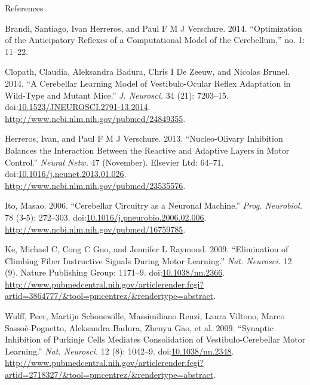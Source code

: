 \documentclass[ignorenonframetext,]{beamer}
\begin{document}
\begin{frame}{References}

\fontsize{6}{10} \selectfont

Brandi, Santiago, Ivan Herreros, and Paul F M J Verschure. 2014.
``Optimization of the Anticipatory Reflexes of a Computational Model of
the Cerebellum,'' no. 1: 11--22.

Clopath, Claudia, Aleksandra Badura, Chris I {De Zeeuw}, and Nicolas
Brunel. 2014. ``A Cerebellar Learning Model of Vestibulo-Ocular Reflex
Adaptation in Wild-Type and Mutant Mice.'' \emph{J. Neurosci.} 34 (21):
7203--15.
doi:\href{http://dx.doi.org/10.1523/JNEUROSCI.2791-13.2014}{10.1523/JNEUROSCI.2791-13.2014}.
\url{http://www.ncbi.nlm.nih.gov/pubmed/24849355}.

Herreros, Ivan, and Paul F M J Verschure. 2013. ``Nucleo-Olivary
Inhibition Balances the Interaction Between the Reactive and Adaptive
Layers in Motor Control.'' \emph{Neural Netw.} 47 (November). Elsevier
Ltd: 64--71.
doi:\href{http://dx.doi.org/10.1016/j.neunet.2013.01.026}{10.1016/j.neunet.2013.01.026}.
\url{http://www.ncbi.nlm.nih.gov/pubmed/23535576}.

Ito, Masao. 2006. ``Cerebellar Circuitry as a Neuronal Machine.''
\emph{Prog. Neurobiol.} 78 (3-5): 272--303.
doi:\href{http://dx.doi.org/10.1016/j.pneurobio.2006.02.006}{10.1016/j.pneurobio.2006.02.006}.
\url{http://www.ncbi.nlm.nih.gov/pubmed/16759785}.

Ke, Michael C, Cong C Guo, and Jennifer L Raymond. 2009. ``Elimination
of Climbing Fiber Instructive Signals During Motor Learning.''
\emph{Nat. Neurosci.} 12 (9). Nature Publishing Group: 1171--9.
doi:\href{http://dx.doi.org/10.1038/nn.2366}{10.1038/nn.2366}.
\url{http://www.pubmedcentral.nih.gov/articlerender.fcgi?artid=3864777/\&tool=pmcentrez/\&rendertype=abstract}.

Wulff, Peer, Martijn Schonewille, Massimiliano Renzi, Laura Viltono,
Marco Sassoè-Pognetto, Aleksandra Badura, Zhenyu Gao, et al. 2009.
``Synaptic Inhibition of Purkinje Cells Mediates Consolidation of
Vestibulo-Cerebellar Motor Learning.'' \emph{Nat. Neurosci.} 12 (8):
1042--9. doi:\href{http://dx.doi.org/10.1038/nn.2348}{10.1038/nn.2348}.
\url{http://www.pubmedcentral.nih.gov/articlerender.fcgi?artid=2718327/\&tool=pmcentrez/\&rendertype=abstract}.

\end{frame}
\end{document}

